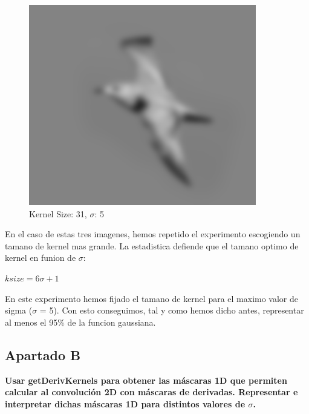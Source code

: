 \documentclass{article}
\begin{document}
\begin{minipage}{\linewidth}
    \begin{minipage}{0.45\linewidth}
        \begin{figure}[H]
            \includegraphics[width=\linewidth]{Ejercicio1a/gaussiana(31,31)5.png}
            \caption{Kernel Size: 31, $\sigma$: 5}
        \end{figure}
    \end{minipage}    
\end{minipage}
\linebreak
En el caso de estas tres imagenes, hemos repetido el experimento escogiendo un tamano de kernel mas grande. La estadistica defiende que el tamano optimo de kernel en funion de $\sigma$:

\begin{center}
$ksize = 6 \sigma + 1$
\end{center}

En este experimento hemos fijado el tamano de kernel para el maximo valor de sigma ($\sigma$ = 5). Con esto conseguimos, tal y como hemos dicho antes, representar al menos el 95\% de la funcion gaussiana.

\subsection*{Apartado B}
\textbf{Usar getDerivKernels para obtener las máscaras 1D que permiten calcular al convolución 2D con máscaras de derivadas. Representar e interpretar dichas máscaras 1D para distintos valores de $\sigma$.}
\end{document}
